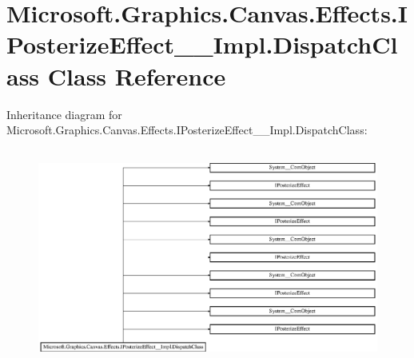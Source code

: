 \hypertarget{class_microsoft_1_1_graphics_1_1_canvas_1_1_effects_1_1_i_posterize_effect_____impl_1_1_dispatch_class}{}\section{Microsoft.\+Graphics.\+Canvas.\+Effects.\+I\+Posterize\+Effect\+\_\+\+\_\+\+Impl.\+Dispatch\+Class Class Reference}
\label{class_microsoft_1_1_graphics_1_1_canvas_1_1_effects_1_1_i_posterize_effect_____impl_1_1_dispatch_class}
Inheritance diagram for Microsoft.\+Graphics.\+Canvas.\+Effects.\+I\+Posterize\+Effect\+\_\+\+\_\+\+Impl.\+Dispatch\+Class\+:\begin{figure}[H]
\begin{center}
\leavevmode
\includegraphics[height=7.162791cm]{class_microsoft_1_1_graphics_1_1_canvas_1_1_effects_1_1_i_posterize_effect_____impl_1_1_dispatch_class}
\end{center}
\end{figure}
